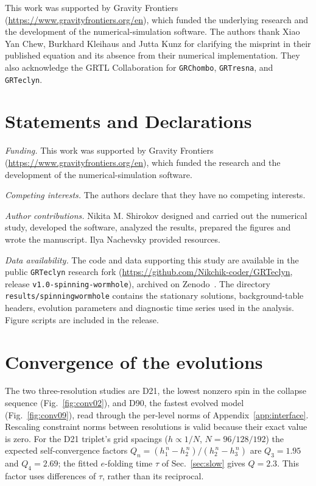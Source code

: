 \documentclass[twocolumn,floatfix,aps,prd,superscriptaddress,nofootinbib]{revtex4-2}
\begin{document}
\begin{acknowledgments}
This work was supported by Gravity Frontiers
(\url{https://www.gravityfrontiers.org/en}), which funded the underlying
research and the development of the numerical-simulation software. The authors
thank Xiao Yan Chew, Burkhard Kleihaus and Jutta Kunz for clarifying the misprint in their published equation and its absence from their numerical implementation. They also acknowledge the GRTL Collaboration for \texttt{GRChombo}, \texttt{GRTresna},
and \texttt{GRTeclyn}.
\end{acknowledgments}

\section*{Statements and Declarations}

\noindent\textit{Funding.} This work was supported by Gravity Frontiers (\url{https://www.gravityfrontiers.org/en}), which funded the research and the development of the numerical-simulation software.

\noindent\textit{Competing interests.} The authors declare that they have no competing interests.

\noindent\textit{Author contributions.} Nikita M. Shirokov designed and carried out the numerical study, developed the software, analyzed the results, prepared the figures and wrote the manuscript. Ilya Nachevsky provided resources.

\noindent\textit{Data availability.} The code and data supporting this study are available in the public \texttt{GRTeclyn} research fork (\url{https://github.com/Nikchik-coder/GRTeclyn}, release \texttt{v1.0-spinning-wormhole}), archived on Zenodo~\cite{shirokov2026code}. The directory \texttt{results/spinningwormhole} contains the stationary solutions, background-table headers, evolution parameters and diagnostic time series used in the analysis. Figure scripts are included in the release.

\appendix

\section{Convergence of the evolutions}
\label{app:conv}

The two three-resolution studies are D21, the lowest nonzero spin in the collapse sequence (Fig.~\ref{fig:conv02}), and D90, the fastest evolved model (Fig.~\ref{fig:conv09}), read through the per-level norms of Appendix~\ref{app:interface}. Rescaling constraint norms between resolutions is valid because their exact value is zero. For the D21 triplet's grid spacings ($h\propto1/N$, $N=96/128/192$) the expected self-convergence factors $Q_n=(h_1^{\,n}-h_2^{\,n})/(h_2^{\,n}-h_3^{\,n})$ are $Q_3=1.95$ and $Q_4=2.69$; the fitted $e$-folding time $\tau$ of Sec.~\ref{sec:slow} gives $Q=2.3$. This factor uses differences of $\tau$, rather than its reciprocal.
\end{document}
